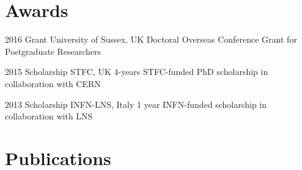 \documentclass[]{cv} %
\begin{document}
\section{Awards}

\begin{entrylist}
  \entry
      {2016}
      {Grant}
      {University of Sussex, UK}
      {Doctoral Overseas Conference Grant for Postgraduate Researchers}

  \entry
      {2015}
      {Scholarship}
      {STFC, UK}
      {4-years STFC-funded PhD scholarship in collaboration with CERN}

  \entry
      {2013}
      {Scholarship}
      {INFN-LNS, Italy}
      {1 year INFN-funded scholarship in collaboration with LNS}
\end{entrylist}

 \section{Publications}
 \begin{refsection} %
 \nocite{*}
     \printbibliography[type=inproceedings, title={International peer-reviewed conferences/proceedings}, heading=bibheading]
\end{refsection}


\raggedbottom
\end{document}
